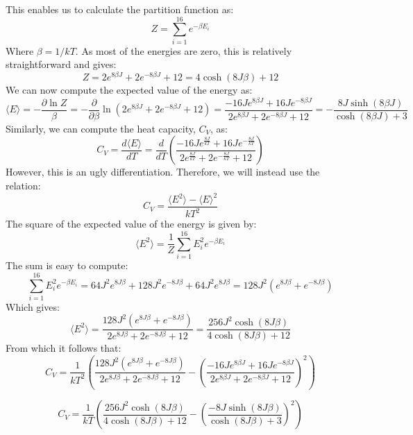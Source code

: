 \documentclass[a4paper, 10pt]{article}
\begin{document}
This enables us to calculate the partition function as:
$$Z=\sum_{i=1}^{16} e^{-\beta E_i}$$
Where $\beta=1/kT$. As most of the energies are zero, this is relatively straightforward and gives:
$$Z=2e^{8\beta J}+2e^{-8\beta J} + 12=4\cosh (8J\beta) +12$$
We can now compute the expected value of the energy as:
\begin{equation}\label{eq:2x2energy}
\langle E \rangle =  -\frac{\partial \ln Z}{\beta}=-\frac{\partial}{\partial \beta}\ln\left(2e^{8\beta J}+2e^{-8\beta J}+12\right)=\frac{-16Je^{8\beta J}+16Je^{-8\beta J}}{2e^{8\beta J}+2e^{-8\beta J}+12}=-\frac{8J\sinh(8\beta J)}{\cosh(8\beta J)+3}
\end{equation}
Similarly, we can compute the heat capacity, $C_V$, as:
$$C_V=\frac{d\langle E \rangle}{dT}=\frac{d}{dT}\left(\frac{-16Je^{\frac{8J}{kT}}+16Je^{-\frac{8J}{kT}}}{2e^{\frac{8J}{kT}}+2e^{-\frac{8J}{kT}}+12}\right)$$
However, this is an ugly differentiation. Therefore, we will instead use the relation:
$$C_V=\frac{\langle E^2 \rangle - \langle E \rangle^2}{kT^2}$$
The square of the expected value of the energy is given by:
$$\langle E^2\rangle=\frac{1}{Z} \sum_{i=1}^ {16}E_i^2e^{-\beta E_i}$$
The sum is easy to compute:
$$\sum_{i=1}^{16}E_i^2e^{-\beta E_i}=64J^2e^{8J\beta}+128J^2e^{-8J\beta}+64J^2e^{8J\beta}=128J^2\left(e^{8J\beta}+e^{-8J\beta}\right)$$
Which gives:
$$\langle E^2\rangle = \frac{128J^2\left(e^{8J\beta}+e^{-8J\beta}\right)}{2e^{8J\beta}+2e^{-8J\beta}+12}=\frac{256J^2\cosh(8J\beta)}{4\cosh(8J\beta)+12}$$
From which it follows that:
$$C_V=\frac{1}{kT^2}\left(\frac{128J^2\left(e^{8J\beta}+e^{-8J\beta}\right)}{2e^{8J\beta}+2e^{-8J\beta}+12}-\left(\frac{-16Je^{8\beta J}+16Je^{-8\beta J}}{2e^{8\beta J}+2e^{-8\beta J}+12}\right)^2\right)$$

\begin{equation}\label{eq:2x2Cv}
C_V=\frac{1}{kT}\left(\frac{256J^2\cosh(8J\beta)}{4\cosh(8J\beta)+12}-\left(\frac{-8J\sinh(8J\beta)}{\cosh(8J\beta)+3}\right)^2\right)
\end{equation}
\end{document}
